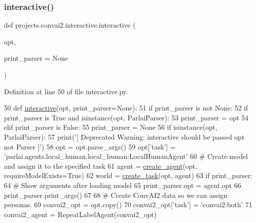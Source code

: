 \subsubsection{\texorpdfstring{interactive()}{interactive()}}
{\footnotesize\ttfamily def projects.\+convai2.\+interactive.\+interactive (\begin{DoxyParamCaption}\item[{}]{opt,  }\item[{}]{print\+\_\+parser = {\ttfamily None} }\end{DoxyParamCaption})}



Definition at line 50 of file interactive.\+py.


\begin{DoxyCode}
50 \textcolor{keyword}{def }\hyperlink{namespaceprojects_1_1self__feeding_1_1interactive_aaebd4c577ab0371c73e8442be469ebab}{interactive}(opt, print\_parser=None):
51     \textcolor{keywordflow}{if} print\_parser \textcolor{keywordflow}{is} \textcolor{keywordflow}{not} \textcolor{keywordtype}{None}:
52         \textcolor{keywordflow}{if} print\_parser \textcolor{keywordflow}{is} \textcolor{keyword}{True} \textcolor{keywordflow}{and} isinstance(opt, ParlaiParser):
53             print\_parser = opt
54         \textcolor{keywordflow}{elif} print\_parser \textcolor{keywordflow}{is} \textcolor{keyword}{False}:
55             print\_parser = \textcolor{keywordtype}{None}
56     \textcolor{keywordflow}{if} isinstance(opt, ParlaiParser):
57         print(\textcolor{stringliteral}{'[ Deprecated Warning: interactive should be passed opt not Parser ]'})
58         opt = opt.parse\_args()
59     opt[\textcolor{stringliteral}{'task'}] = \textcolor{stringliteral}{'parlai.agents.local\_human.local\_human:LocalHumanAgent'}
60     \textcolor{comment}{# Create model and assign it to the specified task}
61     agent = \hyperlink{namespaceparlai_1_1core_1_1agents_ad0d54074d4bcc148bb415ab5515a53b5}{create\_agent}(opt, requireModelExists=\textcolor{keyword}{True})
62     world = \hyperlink{namespaceparlai_1_1core_1_1worlds_a11923c10b545c7ecc1b08fe2242d9c2c}{create\_task}(opt, agent)
63     \textcolor{keywordflow}{if} print\_parser:
64         \textcolor{comment}{# Show arguments after loading model}
65         print\_parser.opt = agent.opt
66         print\_parser.print\_args()
67 
68     \textcolor{comment}{# Create ConvAI2 data so we can assign personas.}
69     convai2\_opt = opt.copy()
70     convai2\_opt[\textcolor{stringliteral}{'task'}] = \textcolor{stringliteral}{'convai2:both'}
71     convai2\_agent = RepeatLabelAgent(convai2\_opt)

\end{DoxyCode}
